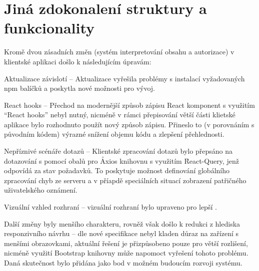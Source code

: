 \section{Jiná zdokonalení struktury a funkcionality}\label{sec:client-improve}

Kromě dvou zásadních změn (systém interpretování obsahu a autorizace) v klientské aplikaci došlo k následujícím úpravám:

\begin{dl}
   \item[Aktualizace závislotí] – Aktualizace vyřešila problémy s instalací vyžadovaných npm balíčků a poskytla nové možnosti pro vývoj.

   \item[React hooks] – Přechod na modernější způsob zápisu React komponent s využitím \enquote{React hooks} nebyl nutný, nicméně v rámci přepisování větší části klietské aplikace bylo rozhodnuto použít nový způsob zápisu.
   Přineslo to (v porovnáním s původním kódem) výrazné snížení objemu kódu a zlepšení přehlednosti.

   \item[Nepříznivé scénáře \g{API} dotazů] – Klientské zpracování  dotazů bylo přepsáno na dotazování s pomocí obalů pro \h{Axios} knihovnu s využitím \h{React-Query}, jenž odpovídá za stav požadavků.
   To poskytuje možnost definování globálního zpracování chyb ze serveru a v příapdě speciálních situací zobrazení patřičného uživatelského oznámení.

   \item[Vizuální vzhled rozhraní] – vizuální rozhraní bylo upraveno pro lepší .
\end{dl}

Další změny byly menšího charakteru, rovněž však došlo k redukci z hlediska responzivního návrhu – dle nové specifikace nebyl kladen důraz na zařízení s menšími obrazovkami, aktuální řešení je přizpůsobeno pouze pro větší rozlišení, nicméně využití Bootstrap knihovny může napomoct vyřešení tohoto problému.
Daná skutečnost bylo přidána jako bod v možném budoucím rozvoji systému.
